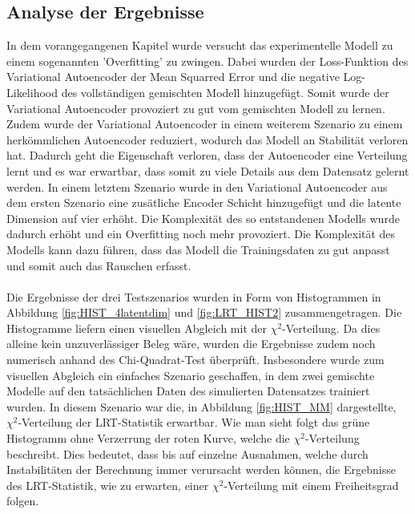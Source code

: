 \documentclass[%
thesis=student,%
coverpage=false,%
titlepage=false,%
headmarks=true, %
german,%
font=libertine, %
math=newpxtx, %
BCOR=5mm,%
coverBCOR=11mm%
]{tumbook}
\theoremstyle{break}
\begin{document}
\subsection{Analyse der Ergebnisse}
In dem vorangegangenen Kapitel wurde versucht das experimentelle Modell zu einem sogenannten 'Overfitting' zu zwingen. Dabei wurden der Loss-Funktion des Variational Autoencoder der Mean Squarred Error und die negative Log-Likelihood des vollständigen gemischten Modell hinzugefügt. Somit wurde der Variational Autoencoder provoziert zu gut vom gemischten Modell zu lernen. Zudem wurde der Variational Autoencoder in einem weiterem Szenario zu einem herkömmlichen Autoencoder reduziert, wodurch das Modell an Stabilität verloren hat. Dadurch geht die Eigenschaft verloren, dass der Autoencoder eine Verteilung lernt und es war erwartbar, dass somit zu viele Details aus dem Datensatz gelernt werden. In einem letztem Szenario wurde in den Variational Autoencoder aus dem ersten Szenario eine zusätliche Encoder Schicht hinzugefügt und die latente Dimension auf vier erhöht. Die Komplexität des so entstandenen Modells wurde dadurch erhöht und ein Overfitting noch mehr provoziert. Die Komplexität des Modells kann dazu führen, dass das Modell die Trainingsdaten zu gut anpasst und somit auch das Rauschen erfasst.\\
\\
Die Ergebnisse der drei Testszenarios wurden in Form von Histogrammen in Abbildung \ref{fig:HIST_4latentdim} und \ref{fig:LRT_HIST2} zusammengetragen. Die Histogramme liefern einen visuellen Abgleich mit der $\chi^2$-Verteilung. Da dies alleine kein unzuverlässiger Beleg wäre, wurden die Ergebnisse zudem noch numerisch anhand des Chi-Quadrat-Test überprüft. Insbesondere wurde zum visuellen Abgleich ein einfaches Szenario geschaffen, in dem zwei gemischte Modelle auf den tatsächlichen Daten des simulierten Datensatzes trainiert wurden. In diesem Szenario war die, in Abbildung \ref{fig:HIST_MM} dargestellte, $\chi^2$-Verteilung der LRT-Statistik erwartbar. Wie man sieht folgt das grüne Histogramm ohne Verzerrung der roten Kurve, welche die $\chi^2$-Verteilung beschreibt. Dies bedeutet, dass bis auf einzelne Ausnahmen, welche durch Instabilitäten der Berechnung immer verursacht werden können, die Ergebnisse des LRT-Statistik, wie zu erwarten, einer $\chi^2$-Verteilung mit einem Freiheitsgrad folgen.\\
\\
\end{document}
